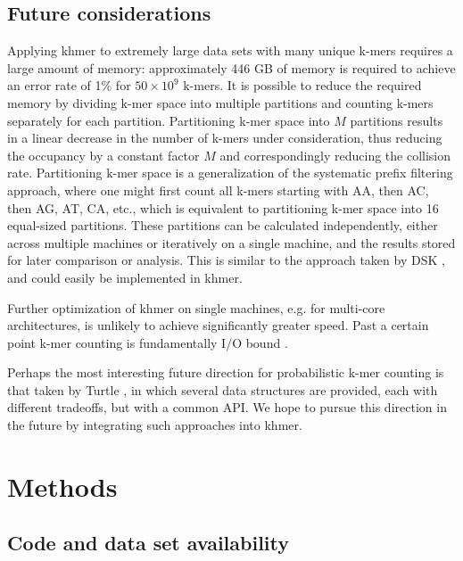 \documentclass[10pt]{article}
\begin{document}
\subsection*{Future considerations}

Applying khmer to extremely large data sets with many unique k-mers
requires a large amount of memory: approximately 446 GB of memory is
required to achieve an error rate of 1\% for $50\times 10^9$
k-mers. It is possible to reduce the required memory by dividing k-mer
space into multiple partitions and counting k-mers separately for each
partition. Partitioning k-mer space into $M$ partitions results in a
linear decrease in the number of k-mers under consideration, thus
reducing the occupancy by a constant factor $M$ and correspondingly
reducing the collision rate.  Partitioning k-mer space is a
generalization of the systematic prefix filtering approach, where one
might first count all k-mers starting with AA, then AC, then AG, AT,
CA, etc., which is equivalent to partitioning k-mer space into 16
equal-sized partitions. These partitions can be calculated
independently, either across multiple machines or iteratively on a
single machine, and the results stored for later comparison or
analysis.  This is similar to the approach taken by DSK
\cite{Rizk2013}, and could easily be implemented in khmer.

Further optimization of khmer on single machines, e.g. for multi-core
architectures, is unlikely to achieve significantly greater speed.
Past a certain point k-mer counting is fundamentally I/O bound
\cite{McDonald2013}.

Perhaps the most interesting future direction for probabilistic k-mer
counting is that taken by Turtle \cite{Roy2014}, in which several data
structures are provided, each with different tradeoffs, but with a
common API.  We hope to pursue this direction in the future by
integrating such approaches into khmer.

\section*{Methods}

\subsection*{Code and data set availability}
\end{document}
